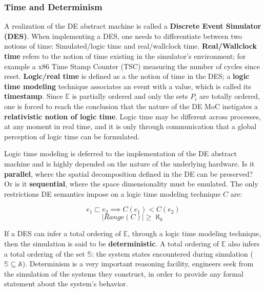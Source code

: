 \documentclass[11pt]{article}
\begin{document}
\subsubsection{Time and Determinism}
\label{sec:org6436102}
A realization of the DE abstract machine is called a \textbf{Discrete Event Simulator (DES)}.
When implementing a DES, one needs to differentiate between two notions of time: Simulated/logic time and real/wallclock time.
\textbf{Real/Wallclock time} refers to the notion of time existing in the simulator's environment; for example a x86 Time Stamp Counter (TSC) measuring the number of cycles since reset.
\textbf{Logic/real time} is defined as a the notion of time in the DES; a \textbf{logic time modeling} technique associates an event with a value, which is called its \textbf{timestamp}.
Since \(\mathds{E}\) is partially ordered and only the sets \(P_i\) are totally ordered, one is forced to reach the conclusion that the nature of the DE MoC instigates a \textbf{relativistic notion of logic time}.
Logic time may be different across processes, at any moment in real time, and it is only through communication that a global perception of logic time can be formulated.

Logic time modeling is deferred to the implementation of the DE abstract machine and is highly depended on the nature of the underlying hardware. 
Is it \textbf{parallel}, where the spatial decomposition defined in the DE can be preserved? 
Or is it \textbf{sequential}, where the space dimensionality must be emulated.
The only restrictions DE semantics impose on a logic time modeling technique \(C\) are:

\begin{equation}
\tag{Axiom 5}
       e_1 \sqsubset e_2 \implies C(e_1) < C(e_2) 
\end{equation}
\begin{equation}
\tag{Axiom 6}
       |Range(C)| \geq \aleph_0
\end{equation}

If a DES can infer a total ordering of \(\mathds{E}\), through a logic time modeling technique, then the simulation is said to be \textbf{deterministic}.
A total ordering of \(\mathds{E}\) also infers a total ordering of the set \(\mathds{S}\): the system states encountered during simulation (\(\mathds{S} \subseteq \mathds{A}\)).
Determinism is a very important reasoning facility, engineers seek from the simulation of the systems they construct, in order to provide any formal statement about the system's behavior.
\end{document}
